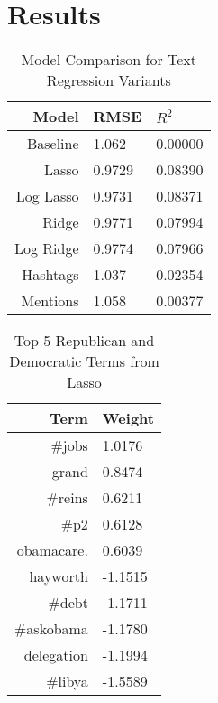 \documentclass[11pt]{article}
\begin{document}
\section{Results}

\begin{table}[htdp]
\caption{Model Comparison for Text Regression Variants}
\begin{center}
\begin{tabular}{|r|l|l|}
\hline
Model & RMSE & $R^2$\\
\hline
Baseline & 1.062 & 0.00000 \\
Lasso & 0.9729 & 0.08390 \\
Log Lasso & 0.9731 & 0.08371 \\
Ridge & 0.9771 & 0.07994 \\
Log Ridge & 0.9774 & 0.07966 \\
Hashtags & 1.037 & 0.02354 \\
Mentions & 1.058 & 0.00377 \\
\hline
\end{tabular}
\end{center}
\end{table}

\begin{table}[htdp]
\caption{Top 5 Republican and Democratic Terms from Lasso}
\begin{center}
\begin{tabular}{|r|l|}
\hline
Term & Weight \\
\hline
\#jobs & 1.0176 \\
grand & 0.8474 \\
\#reins & 0.6211 \\
\#p2 & 0.6128 \\
obamacare. & 0.6039 \\
\hline
hayworth & -1.1515 \\
\#debt & -1.1711 \\
\#askobama & -1.1780 \\
delegation & -1.1994 \\
\#libya & -1.5589 \\
\hline
\end{tabular}
\end{center}
\end{table}
\end{document}
